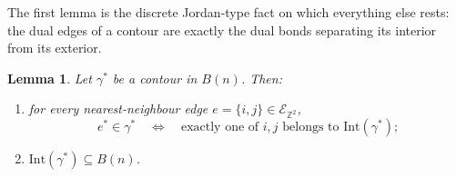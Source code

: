 \documentclass[11pt]{article}
\theoremstyle{plain}
\newtheorem{lemma}[theorem]{Lemma}
\theoremstyle{definition}
\theoremstyle{remark}
\newcommand{\Z}{\mathbb{Z}}
\newcommand{\Eset}{\mathscr{E}}
\newcommand{\Intr}{\mathrm{Int}}    %
\begin{document}
The first lemma is the discrete Jordan-type fact on which everything else
rests: the dual edges of a contour are exactly the dual bonds separating its
interior from its exterior.

\begin{lemma}\label{lem:edge-boundary}
Let $\gamma^*$ be a contour in $B(n)$. Then:
\begin{enumerate}
  \item[(a)] for every nearest-neighbour edge $e=\{i,j\}\in\Eset_{\Z^2}$,
  \[
    e^*\in\gamma^*
    \quad\Longleftrightarrow\quad
    \text{exactly one of $i,j$ belongs to $\Intr(\gamma^*)$;}
  \]
  \item[(b)] $\Intr(\gamma^*)\subseteq B(n)$.
\end{enumerate}
\end{lemma}
\end{document}
